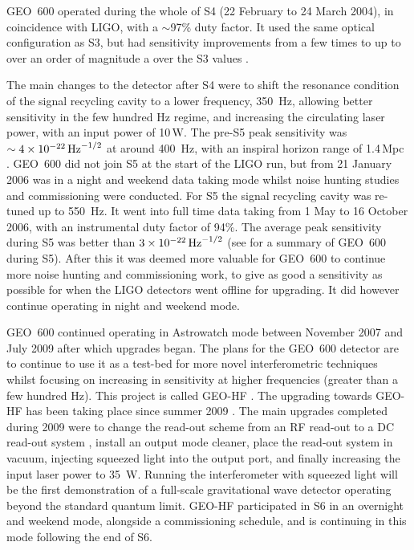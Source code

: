 \documentclass{article}
\begin{document}
GEO~600 operated during the whole of S4 (22 February to 24 March 2004), in
coincidence with LIGO, with a $\sim$97\% duty factor. It used the same optical
configuration as S3, but had sensitivity improvements from a few times to up
to over an order of magnitude a over the S3 values \cite{Hild:2006a}.

The main changes to the detector after S4 were to shift the resonance condition
of the signal recycling cavity to a lower frequency, 350~Hz, allowing better
sensitivity in the few hundred Hz regime, and increasing the circulating laser
power, with an input power of 10\,W. The pre-S5 peak sensitivity was
$\sim4\times10^{-22}\,{\rm Hz}^{-1/2}$ at around 400~Hz, with an inspiral
horizon range of 1.4\,Mpc \cite{Hild:2006b}. GEO~600 did not join S5 at the
start of the LIGO run, but from 21 January 2006 was in a night and weekend data
taking mode whilst noise hunting studies and commissioning were conducted. For
S5 the signal recycling cavity was re-tuned up to 550~Hz. It went into full time
data taking from 1 May to 16 October 2006, with an instrumental duty factor of
94\%. The average peak sensitivity during S5 was better than
$3\times10^{-22}\,{\rm Hz}^{-1/2}$ (see \cite{Willke:2007} for a summary of
GEO~600 during S5). After this it was deemed more valuable for GEO~600 to
continue more noise hunting and commissioning work, to give as good a
sensitivity as possible for when the LIGO detectors went offline for upgrading.
It did however continue operating in night and weekend mode. 

GEO~600  continued operating in Astrowatch mode between November 2007 and July 
2009 after which upgrades began. The plans for the GEO~600 detector are to 
continue to use it as a test-bed for more novel interferometric techniques whilst 
focusing on increasing in sensitivity at higher frequencies (greater than a 
few hundred Hz). This project is called
GEO-HF \cite{Willke:2006}. The upgrading towards GEO-HF has been taking
place since summer 2009 \cite{Grote:2010}. The main upgrades completed during 2009 were to change 
the read-out scheme from an RF read-out to a DC read-out system \cite{Hild:2008}, 
install an output mode cleaner, place the read-out system in vacuum, injecting 
squeezed light \cite{Vahlbruch:2008, Chelkowski:2007} into the output port, and 
finally increasing the input laser power to 35~W. Running the interferometer
with squeezed light will be the first demonstration of a full-scale gravitational
wave detector operating beyond the standard quantum limit. GEO-HF participated in 
S6 in an overnight and weekend mode, alongside a commissioning schedule, and is 
continuing in this mode following the end of S6.
\end{document}
